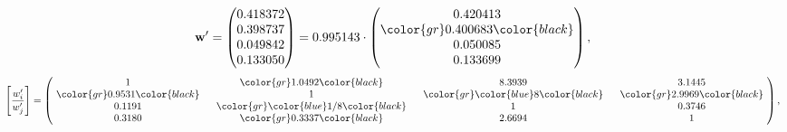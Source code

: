 \begin{example}
\begin{equation*}
\mathbf{w}^{\prime} =
\begin{pmatrix}
0.418372\\
0.398737\\
0.049842\\
0.133050
\end{pmatrix} =
0.995143\cdot
\begin{pmatrix}
0.420413\\
\color{gr} 0.400683\color{black} \\
0.050085\\
0.133699
\end{pmatrix},
\end{equation*}
\begin{equation*}
\left[ \frac{{w}^{\prime}_i}{{w}^{\prime}_j} \right] =
\begin{pmatrix}
$\,\,$ 1 $\,\,$ & $\,\,$\color{gr} 1.0492\color{black} $\,\,$ & $\,\,$8.3939$\,\,$ & $\,\,$3.1445$\,\,$ \\
$\,\,$\color{gr} 0.9531\color{black} $\,\,$ & $\,\,$ 1 $\,\,$ & $\,\,$\color{gr} \color{blue} 8\color{black} $\,\,$ & $\,\,$\color{gr} 2.9969\color{black}   $\,\,$ \\
$\,\,$0.1191$\,\,$ & $\,\,$\color{gr} \color{blue}  1/8\color{black} $\,\,$ & $\,\,$ 1 $\,\,$ & $\,\,$0.3746 $\,\,$ \\
$\,\,$0.3180$\,\,$ & $\,\,$\color{gr} 0.3337\color{black} $\,\,$ & $\,\,$2.6694$\,\,$ & $\,\,$ 1  $\,\,$ \\
\end{pmatrix},
\end{equation*}
\end{example}
\newpage
